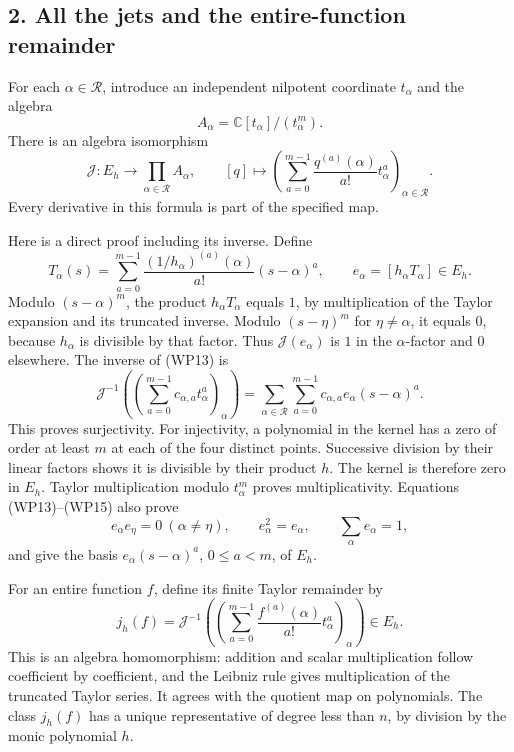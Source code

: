 \documentclass[
  10pt,
  a4paper,
]{article}
\begin{document}
\subsection{2. All the jets and the entire-function
remainder}\label{all-the-jets-and-the-entire-function-remainder}

For each \(\alpha\in\mathcal R\), introduce an independent nilpotent
coordinate \(t_\alpha\) and the algebra \[
A_\alpha=\mathbb C[t_\alpha]/(t_\alpha^m).
\tag{WP12}
\] There is an algebra isomorphism \[
\mathcal J:E_h\longrightarrow\prod_{\alpha\in\mathcal R}A_\alpha,
\qquad
[q]\longmapsto\left(
\sum_{a=0}^{m-1}\frac{q^{(a)}(\alpha)}{a!}t_\alpha^a
\right)_{\alpha\in\mathcal R}.
\tag{WP13}
\] Every derivative in this formula is part of the specified map.

Here is a direct proof including its inverse. Define \[
T_\alpha(s)=\sum_{a=0}^{m-1}
\frac{(1/h_\alpha)^{(a)}(\alpha)}{a!}(s-\alpha)^a,
\qquad e_\alpha=[h_\alpha T_\alpha]\in E_h.
\tag{WP14}
\] Modulo \((s-\alpha)^m\), the product \(h_\alpha T_\alpha\) equals
\(1\), by multiplication of the Taylor expansion and its truncated
inverse. Modulo \((s-\eta)^m\) for \(\eta\ne\alpha\), it equals \(0\),
because \(h_\alpha\) is divisible by that factor. Thus
\(\mathcal J(e_\alpha)\) is \(1\) in the \(\alpha\)-factor and \(0\)
elsewhere. The inverse of (WP13) is \[
\mathcal J^{-1}\left(\left(\sum_{a=0}^{m-1}c_{\alpha,a}t_\alpha^a\right)_\alpha\right)
=\sum_{\alpha\in\mathcal R}\sum_{a=0}^{m-1}
c_{\alpha,a}e_\alpha(s-\alpha)^a.
\tag{WP15}
\] This proves surjectivity. For injectivity, a polynomial in the kernel
has a zero of order at least \(m\) at each of the four distinct points.
Successive division by their linear factors shows it is divisible by
their product \(h\). The kernel is therefore zero in \(E_h\). Taylor
multiplication modulo \(t_\alpha^m\) proves multiplicativity. Equations
(WP13)--(WP15) also prove \[
e_\alpha e_\eta=0\ (\alpha\ne\eta),\qquad
e_\alpha^2=e_\alpha,\qquad\sum_\alpha e_\alpha=1,
\tag{WP16}
\] and give the basis \(e_\alpha(s-\alpha)^a\), \(0\le a<m\), of
\(E_h\).

For an entire function \(f\), define its finite Taylor remainder by \[
j_h(f)=\mathcal J^{-1}\left(\left(
\sum_{a=0}^{m-1}\frac{f^{(a)}(\alpha)}{a!}t_\alpha^a
\right)_\alpha\right)\in E_h.
\tag{WP17}
\] This is an algebra homomorphism: addition and scalar multiplication
follow coefficient by coefficient, and the Leibniz rule gives
multiplication of the truncated Taylor series. It agrees with the
quotient map on polynomials. The class \(j_h(f)\) has a unique
representative of degree less than \(n\), by division by the monic
polynomial \(h\).
\end{document}
